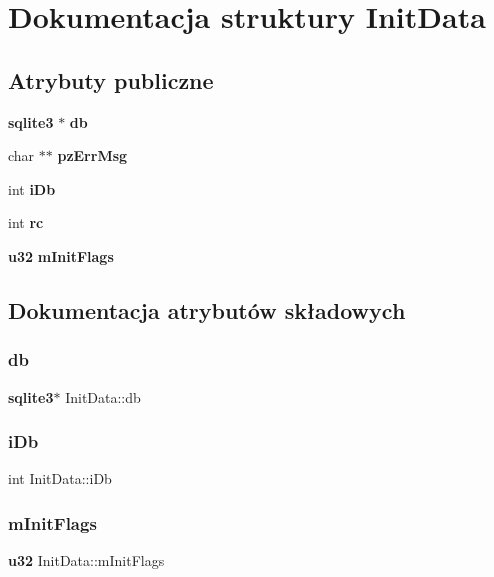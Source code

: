 \section{Dokumentacja struktury Init\+Data}
\label{struct_init_data}
\subsection*{Atrybuty publiczne}
\begin{DoxyCompactItemize}
\item 
\textbf{ sqlite3} $\ast$ \textbf{ db}
\item 
char $\ast$$\ast$ \textbf{ pz\+Err\+Msg}
\item 
int \textbf{ i\+Db}
\item 
int \textbf{ rc}
\item 
\textbf{ u32} \textbf{ m\+Init\+Flags}
\end{DoxyCompactItemize}


\subsection{Dokumentacja atrybutów składowych}
\mbox{\label{struct_init_data_adc9e29c56e0392076e92d7f4b29fa272}} 
\subsubsection{db}
{\footnotesize\ttfamily \textbf{ sqlite3}$\ast$ Init\+Data\+::db}

\mbox{\label{struct_init_data_ad6c7953b49d351cd9fb14e3394010689}} 
\subsubsection{iDb}
{\footnotesize\ttfamily int Init\+Data\+::i\+Db}

\mbox{\label{struct_init_data_a1c6c56f8ac37e912bf33da552d80cf78}} 
\subsubsection{mInitFlags}
{\footnotesize\ttfamily \textbf{ u32} Init\+Data\+::m\+Init\+Flags}

\mbox{\label{struct_init_data_aa8aef34241ec214f038b38932ffe1357}} 
